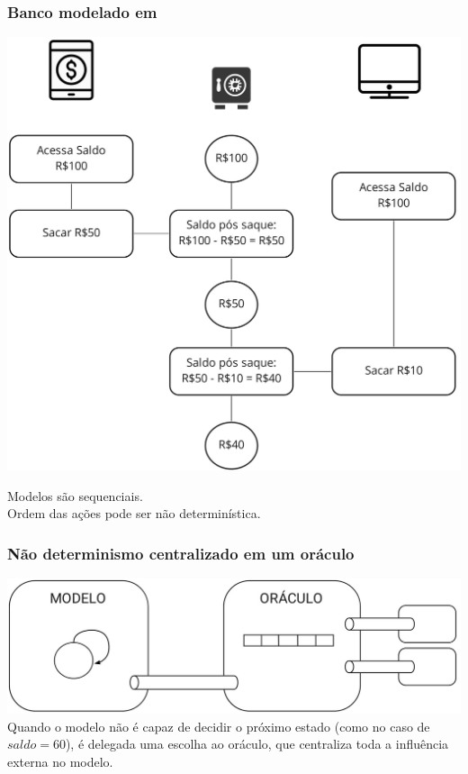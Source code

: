 \documentclass{beamer}
\begin{document}
\begin{frame}
  \frametitle{Banco modelado em \TLA}

  \begin{minipage}{0.6\textwidth}
  \includegraphics[scale=0.12]{img/bank2.png}
  \end{minipage}
  \hfill
  \begin{minipage}{0.3\textwidth}\centering
    Modelos são sequenciais.\\\medskip
    Ordem das ações pode ser não determinística.\\\medskip
  \end{minipage}
\end{frame}

\begin{frame}
  \frametitle{Não determinismo centralizado em um oráculo}
  \includegraphics[scale=0.18]{img/diagram.png}\\
  Quando o modelo não é capaz de decidir o próximo estado (como no caso de
  $saldo = 60$), é delegada uma escolha ao oráculo, que centraliza toda a
  influência externa no modelo.
\end{frame}
\end{document}
